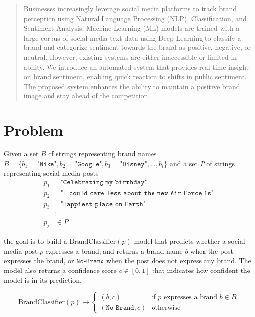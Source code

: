\documentclass{article}
\begin{document}

\begin{abstract}

    \noindent Businesses increasingly leverage social media platforms to track
    brand perception using Natural Language Processing (NLP), Classification, and
    Sentiment Analysis. Machine Learning (ML) models are trained with a large
    corpus of social media text data using Deep Learning to classify a brand and
    categorize sentiment towards the brand as positive, negative, or neutral.
    However, existing systems are either inaccessible or limited in ability. We
    introduce an automated system that provides real-time insight on brand
    sentiment, enabling quick reaction to shifts in public sentiment. The proposed
    system enhances the ability to maintain a positive brand image and stay ahead
    of the competition.

\end{abstract}

\section*{Problem}

Given a set $B$ of strings representing brand names $B = \{b_1 =
    \texttt{"Nike"}, b_2 = \texttt{"Google"}, b_3 = \texttt{"Disney"}, \ldots,
    b_i\}$ and a set $P$ of strings representing social media posts
\begin{align*}
    p_1 & = \texttt{"Celebrating my birthday"}                      \\
    p_2 & = \texttt{"I could care less about the new Air Force 1s"} \\
    p_3 & = \texttt{"Happiest place on Earth"}                      \\
        & \vdots                                                    \\
    p_j & \in P
\end{align*}

the goal is to build a $\mathrm{BrandClassifier}(p)$ model that predicts
whether a social media post $p$ expresses a brand, and returns a brand name $b$
when the post expresses the brand, or $\texttt{No-Brand}$ when the post does
not express any brand. The model also returns a confidence score $c \in [0, 1]$
that indicates how confident the model is in its prediction.

\[
    \mathrm{BrandClassifier}(p) \rightarrow \begin{cases}
        (b, c)                 & \text{if } p \text{ expresses a brand } b \in
        B
        \\
        (\texttt{No-Brand}, c) & \text{otherwise}
    \end{cases}
\]
\end{document}
